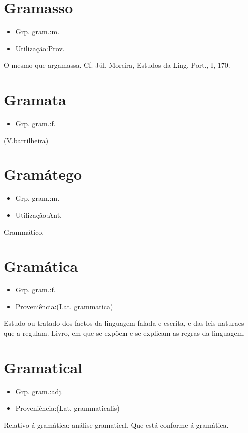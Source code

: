 \section{Gramasso}
\begin{itemize}
\item {Grp. gram.:m.}
\end{itemize}
\begin{itemize}
\item {Utilização:Prov.}
\end{itemize}
O mesmo que \textunderscore argamassa\textunderscore . Cf. Júl. Moreira, \textunderscore Estudos da Líng. Port.\textunderscore , I, 170.
\section{Gramata}
\begin{itemize}
\item {Grp. gram.:f.}
\end{itemize}
(V.barrilheira)
\section{Gramátego}
\begin{itemize}
\item {Grp. gram.:m.}
\end{itemize}
\begin{itemize}
\item {Utilização:Ant.}
\end{itemize}
Grammático.
\section{Gramática}
\begin{itemize}
\item {Grp. gram.:f.}
\end{itemize}
\begin{itemize}
\item {Proveniência:(Lat. \textunderscore grammatica\textunderscore )}
\end{itemize}
Estudo ou tratado dos factos da linguagem falada e escrita, e das leis naturaes que a regulam.
Livro, em que se expõem e se explicam as regras da linguagem.
\section{Gramatical}
\begin{itemize}
\item {Grp. gram.:adj.}
\end{itemize}
\begin{itemize}
\item {Proveniência:(Lat. \textunderscore grammaticalis\textunderscore )}
\end{itemize}
Relativo á gramática: \textunderscore análise gramatical\textunderscore .
Que está conforme á gramática.
